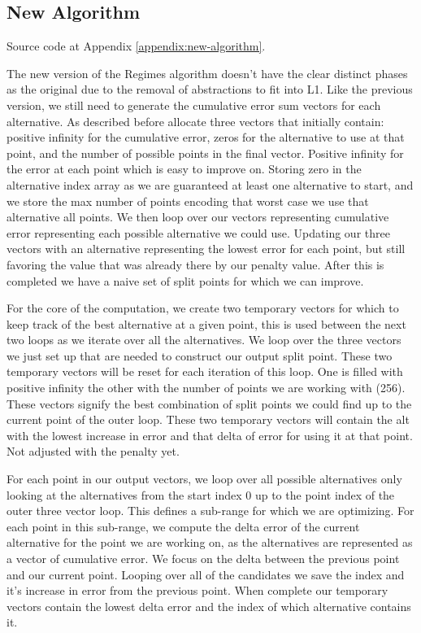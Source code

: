 \documentclass{article}
\begin{document}
\subsection{New Algorithm}

Source code at Appendix \ref{appendix:new-algorithm}.

The new version of the Regimes algorithm doesn’t have the clear distinct phases as the original due to the removal of abstractions to fit into L1. Like the previous version, we still need to generate the cumulative error sum vectors for each alternative. As described before allocate three vectors that initially contain: positive infinity for the cumulative error, zeros for the alternative to use at that point, and the number of possible points in the final vector. Positive infinity for the error at each point which is easy to improve on. Storing zero in the alternative index array as we are guaranteed at least one alternative to start, and we store the max number of points encoding that worst case we use that alternative all points. We then loop over our vectors representing cumulative error representing each possible alternative we could use. Updating our three vectors with an alternative representing the lowest error for each point, but still favoring the value that was already there by our penalty value. After this is completed we have a naive set of split points for which we can improve.

For the core of the computation, we create two temporary vectors for which to keep track of the best alternative at a given point, this is used between the next two loops as we iterate over all the alternatives. We loop over the three vectors we just set up that are needed to construct our output split point. These two temporary vectors will be reset for each iteration of this loop. One is filled with positive infinity the other with the number of points we are working with (256). These vectors signify the best combination of split points we could find up to the current point of the outer loop. These two temporary vectors will contain the alt with the lowest increase in error and that delta of error for using it at that point. Not adjusted with the penalty yet.

For each point in our output vectors, we loop over all possible alternatives only looking at the alternatives from the start index 0 up to the point index of the outer three vector loop. This defines a sub-range for which we are optimizing. For each point in this sub-range, we compute the delta error of the current alternative for the point we are working on, as the alternatives are represented as a vector of cumulative error. We focus on the delta between the previous point and our current point. Looping over all of the candidates we save the index and it's increase in error from the previous point. When complete our temporary vectors contain the lowest delta error and the index of which alternative contains it.
\end{document}
